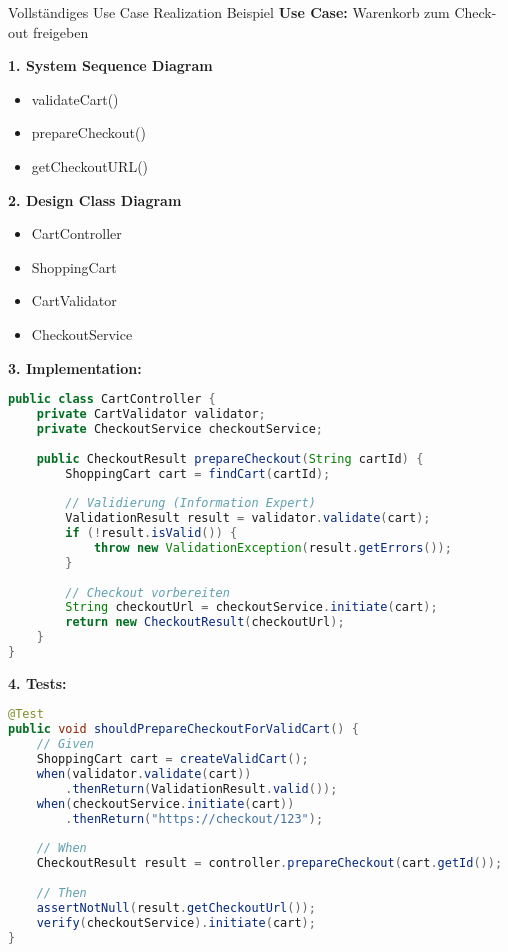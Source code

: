 \begin{example2}{Vollständiges Use Case Realization Beispiel}
\textbf{Use Case:} Warenkorb zum Check-out freigeben

\textbf{1. System Sequence Diagram}
\begin{itemize}
    \item validateCart()
    \item prepareCheckout()
    \item getCheckoutURL()
\end{itemize}

\textbf{2. Design Class Diagram}
\begin{itemize}
    \item CartController
    \item ShoppingCart
    \item CartValidator
    \item CheckoutService
\end{itemize}

\textbf{3. Implementation:}
\begin{lstlisting}[language=Java, style=basesmol]
public class CartController {
    private CartValidator validator;
    private CheckoutService checkoutService;
    
    public CheckoutResult prepareCheckout(String cartId) {
        ShoppingCart cart = findCart(cartId);
        
        // Validierung (Information Expert)
        ValidationResult result = validator.validate(cart);
        if (!result.isValid()) {
            throw new ValidationException(result.getErrors());
        }
        
        // Checkout vorbereiten
        String checkoutUrl = checkoutService.initiate(cart);
        return new CheckoutResult(checkoutUrl);
    }
}
\end{lstlisting}

\textbf{4. Tests:}
\begin{lstlisting}[language=Java, style=basesmol]
@Test
public void shouldPrepareCheckoutForValidCart() {
    // Given
    ShoppingCart cart = createValidCart();
    when(validator.validate(cart))
        .thenReturn(ValidationResult.valid());
    when(checkoutService.initiate(cart))
        .thenReturn("https://checkout/123");
        
    // When
    CheckoutResult result = controller.prepareCheckout(cart.getId());
    
    // Then
    assertNotNull(result.getCheckoutUrl());
    verify(checkoutService).initiate(cart);
}
\end{lstlisting}
\end{example2}


